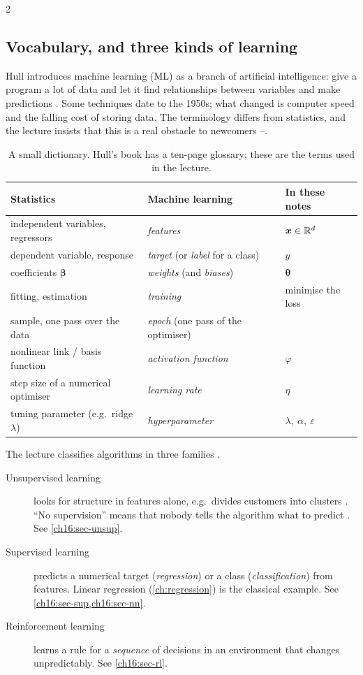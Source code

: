 \begin{paracol}{2}
\subsection{Vocabulary, and three kinds of learning}
Hull introduces machine learning (ML) as a branch of artificial intelligence: give a program a lot of data and let it
find relationships between variables and make predictions . Some techniques date to the 1950s; what changed
is computer speed and the falling cost of storing data. The terminology differs from statistics, and the lecture insists
that this is a real obstacle to newcomers --.
\begin{table}[ht]
\centering\small
\begin{tabular}{@{}l l l@{}}
\toprule
\textbf{Statistics} & \textbf{Machine learning} & \textbf{In these notes}\\
\midrule
independent variables, regressors & \emph{features} & $\bm x\in\mathbb{R}^d$\\
dependent variable, response & \emph{target} (or \emph{label} for a class) & $y$\\
coefficients $\bm\beta$ & \emph{weights} (and \emph{biases}) & $\bm\theta$\\
fitting, estimation & \emph{training} & minimise the loss\\
sample, one pass over the data & \emph{epoch} (one pass of the optimiser) & \\
nonlinear link / basis function & \emph{activation function} & $\varphi$\\
step size of a numerical optimiser & \emph{learning rate} & $\eta$\\
tuning parameter (e.g.\ ridge $\lambda$) & \emph{hyperparameter} & $\lambda,\ \alpha,\ \varepsilon$\\
\bottomrule
\end{tabular}
\caption{A small dictionary. Hull's book has a ten-page glossary; these are the terms used in the lecture.}\label{ch16:tab-dict}
\end{table}

The lecture classifies algorithms in three families .
\begin{description}
  \item[Unsupervised learning] looks for structure in features alone, e.g.\ divides customers into clusters
        . ``No supervision'' means that nobody tells the algorithm what to predict .
        See \cref{ch16:sec-unsup}.
  \item[Supervised learning] predicts a numerical target (\emph{regression}) or a class (\emph{classification}) from features.
        Linear regression (\cref{ch:regression}) is the classical example. See \cref{ch16:sec-sup,ch16:sec-nn}.
  \item[Reinforcement learning] learns a rule for a \emph{sequence} of decisions in an environment that changes
        unpredictably. See \cref{ch16:sec-rl}.
\end{description}


\end{paracol}
